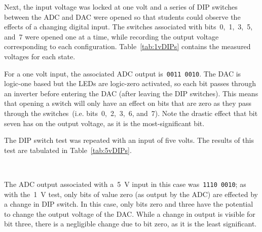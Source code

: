 Next, the input voltage was locked at one volt and a series of DIP switches between the ADC and DAC were opened so that students could observe the effects of a changing digital input.  The switches associated with bits~0,~1,~3,~5, and~7 were opened one at a time, while recording the output voltage corresponding to each configuration.  Table~\ref{tab:1vDIPs} contains the measured voltages for each state.
%
\begin{table}[H]
	\centering
	
	\parbox{.6\textwidth}{
	\caption[\SI{1}{\volt}DC DIP Switches]{Measured output for various DIP switch configurations with a~\SI{1}{\volt} input.}
	\label{tab:1vDIPs}}
\end{table}
%
For a one volt input, the associated ADC output is~\texttt{0011 0010}.  The DAC is logic-one based but the LEDs are logic-zero activated, so each bit passes through an inverter before entering the DAC (after leaving the DIP switches).  This means that opening a switch will only have an effect on bits that are zero as they pass through the switches~(i.e. bits~0,~2,~3,~6, and~7).  Note the drastic effect that bit seven has on the output voltage, as it is the most-significant bit.

The DIP switch test was repeated with an input of five volts.  The results of this test are tabulated in Table~\ref{tab:5vDIPs}.
%
\begin{table}[H]
	\centering
	\\
	\parbox{.6\textwidth}{
	\caption[\SI{5}{\volt}DC DIP Switches]{Output measured for several DIP switch states for a~\SI{5}{\volt} input to the ADC.}
	\label{tab:5vDIPs}}
\end{table}
%
The ADC output associated with a~\SI{5}{\volt} input in this case was~\texttt{1110 0010}; as with the~\SI{1}{\volt} test, only bits of value zero (as output by the ADC) are effected by a change in DIP switch.  In this case, only bits zero and three have the potential to change the output voltage of the DAC.  While a change in output is visible for bit three, there is a negligible change due to bit zero, as it is the least significant.


